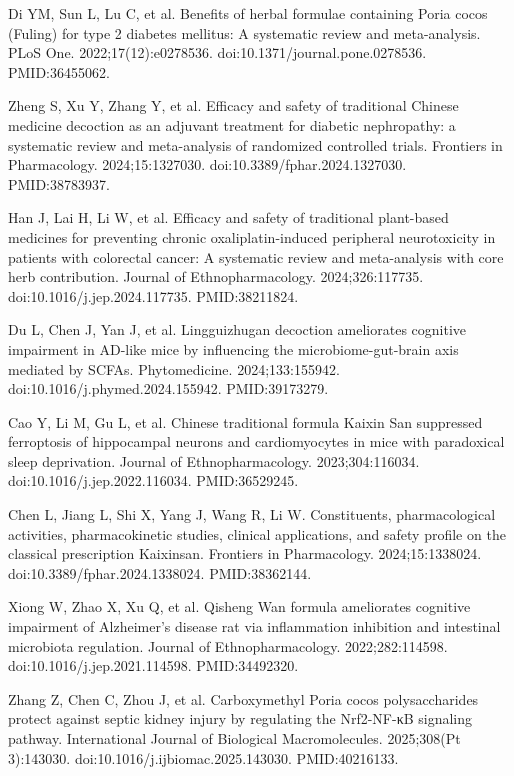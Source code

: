 \documentclass[12pt,oneside]{book}
\newcommand{\reff}[2]{\par\hangindent=7mm\hangafter=1\noindent[#1]\hspace{2mm}#2\par}
\begin{document}
\reff{35}{Di YM, Sun L, Lu C, et al. Benefits of herbal formulae containing Poria cocos (Fuling) for type 2 diabetes mellitus: A systematic review and meta-analysis. PLoS One. 2022;17(12):e0278536. doi:10.1371/journal.pone.0278536. PMID:36455062.}

\reff{36}{Zheng S, Xu Y, Zhang Y, et al. Efficacy and safety of traditional Chinese medicine decoction as an adjuvant treatment for diabetic nephropathy: a systematic review and meta-analysis of randomized controlled trials. Frontiers in Pharmacology. 2024;15:1327030. doi:10.3389/fphar.2024.1327030. PMID:38783937.}

\reff{37}{Han J, Lai H, Li W, et al. Efficacy and safety of traditional plant-based medicines for preventing chronic oxaliplatin-induced peripheral neurotoxicity in patients with colorectal cancer: A systematic review and meta-analysis with core herb contribution. Journal of Ethnopharmacology. 2024;326:117735. doi:10.1016/j.jep.2024.117735. PMID:38211824.}

\reff{38}{Du L, Chen J, Yan J, et al. Lingguizhugan decoction ameliorates cognitive impairment in AD-like mice by influencing the microbiome-gut-brain axis mediated by SCFAs. Phytomedicine. 2024;133:155942. doi:10.1016/j.phymed.2024.155942. PMID:39173279.}

\reff{39}{Cao Y, Li M, Gu L, et al. Chinese traditional formula Kaixin San suppressed ferroptosis of hippocampal neurons and cardiomyocytes in mice with paradoxical sleep deprivation. Journal of Ethnopharmacology. 2023;304:116034. doi:10.1016/j.jep.2022.116034. PMID:36529245.}

\reff{40}{Chen L, Jiang L, Shi X, Yang J, Wang R, Li W. Constituents, pharmacological activities, pharmacokinetic studies, clinical applications, and safety profile on the classical prescription Kaixinsan. Frontiers in Pharmacology. 2024;15:1338024. doi:10.3389/fphar.2024.1338024. PMID:38362144.}

\reff{41}{Xiong W, Zhao X, Xu Q, et al. Qisheng Wan formula ameliorates cognitive impairment of Alzheimer's disease rat via inflammation inhibition and intestinal microbiota regulation. Journal of Ethnopharmacology. 2022;282:114598. doi:10.1016/j.jep.2021.114598. PMID:34492320.}

\reff{42}{Zhang Z, Chen C, Zhou J, et al. Carboxymethyl Poria cocos polysaccharides protect against septic kidney injury by regulating the Nrf2-NF-κB signaling pathway. International Journal of Biological Macromolecules. 2025;308(Pt 3):143030. doi:10.1016/j.ijbiomac.2025.143030. PMID:40216133.}
\end{document}
